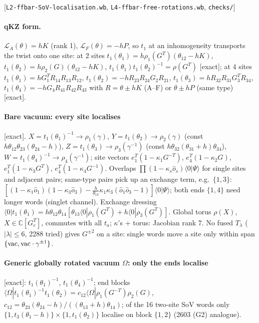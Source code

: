 \documentclass[11pt]{article}
\newcommand{\cL}{\mathcal L}
\newcommand{\nb}[1]{\texttt{#1}}
\newcommand{\ex}{\textsf{[exact]}}
\newcommand{\bra}[1]{\langle#1|}
\begin{document}
[\nb{L2-ffbar-SoV-localisation.wb}, \nb{L4-ffbar-free-rotations.wb}, \nb{checks/}]

\paragraph{qKZ form.} $\cL_A(\theta)=hK$ (rank 1), $\cL_F(\theta)=-hP$, so $t_1$ at an inhomogeneity transports the twist onto
one site: at 2 sites $t_1(\theta_1)=h\rho_1(G^T)(\theta_{12}-hK)$, $t_1(\theta_2)=h\rho_2(G)(\theta_{12}-hK)$,
$t_1(\theta_1)t_1(\theta_2)^{-1}=\rho(G^T)$ \ex; at 4 sites
$t_1(\theta_1)=hG_1^TR_{14}R_{13}R_{12}$, $t_1(\theta_2)=-hR_{23}R_{24}G_2R_{21}$, $t_1(\theta_3)=hR_{32}R_{31}G_3^TR_{34}$,
$t_1(\theta_4)=-hG_4R_{41}R_{42}R_{43}$ with $R=\theta\pm hK$ (A--F) or $\theta\pm hP$ (same type) \ex.

\paragraph{Bare vacuum: every site localises} \ex. $X=t_1(\theta_1)^{-1}\to\rho_1(\gamma)$,
$Y=t_1(\theta_2)\to\rho_2(\gamma)$ (const $h\theta_{12}\theta_{23}(\theta_{24}-h)$), $Z=t_1(\theta_3)\to\rho_3(\gamma^{-1})$
(const $h\theta_{32}(\theta_{31}+h)\theta_{34}$), $W=t_1(\theta_4)^{-1}\to\rho_4(\gamma^{-1})$; site vectors
$e_1^T(1-\kappa_1G^{-T})$, $e_4^T(1-\kappa_2G)$, $e_1^T(1-\kappa_3G^T)$, $e_4^T(1-\kappa_4G^{-1})$. Overlaps
$\prod(1-\kappa_s\hat o_s)\bra0\Psi\rangle$ for single sites and adjacent pairs; same-type pairs pick up an exchange term,
e.g.\ $\{1,3\}$: $[(1-\kappa_1\hat o_1)(1-\kappa_3\hat o_3)-\tfrac{h}{\theta_{13}}\kappa_1\kappa_3(\hat o_1\hat o_3-1)]\bra0\Psi\rangle$;
both ends $\{1,4\}$ need longer words (singlet channel). Exchange dressing
$\bra0t_1(\theta_1)=h\theta_{12}\theta_{14}[\theta_{13}\bra0\rho_1(G^T)+h\bra0\rho_3(G^T)]$. Global torus $\rho(X)$,
$X\in\mathbb C[G_c^T]$, commutes with all $t_a$; $\kappa$'s + torus: Jacobian rank 7. No fused $T_\lambda$ ($|\lambda|\le6$,
2288 tried) gives $G^{\pm2}$ on a site: single words move a site only within span$\{{\rm vac},{\rm vac}\cdot\gamma^{\pm1}\}$.

\paragraph{Generic globally rotated vacuum $\Omega$: only the ends localise} \ex: $t_1(\theta_1)^{-1}$, $t_1(\theta_4)^{-1}$;
end blocks $\bra\Omega t_1(\theta_1)^{-1}t_1(\theta_2)=c_{12}\bra\Omega\rho_1(G^{-T})\rho_2(G)$,
$c_{12}=\theta_{23}(\theta_{24}-h)/((\theta_{13}+h)\theta_{14})$; of the 16 two-site SoV words only
$\{1,t_3(\theta_1-h)\}\times\{1,t_1(\theta_2)\}$ localise on block $\{1,2\}$ (2603 (G2) analogue).
\end{document}
